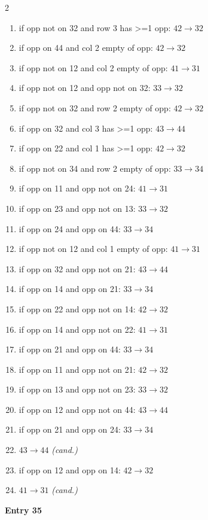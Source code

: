 \begin{multicols}{2}
\begin{tikzpicture}[scale=0.24]
\end{tikzpicture}
\nopagebreak\begin{enumerate}[topsep=1pt,itemsep=0pt,parsep=0pt,leftmargin=2.2em,label=\arabic*.]
\item if opp not on 32 and row 3 has >=1 opp: $42\!\to\!32$
\item if opp on 44 and col 2 empty of opp: $42\!\to\!32$
\item if opp not on 12 and col 2 empty of opp: $41\!\to\!31$
\item if opp not on 12 and opp not on 32: $33\!\to\!32$
\item if opp not on 32 and row 2 empty of opp: $42\!\to\!32$
\item if opp on 32 and col 3 has >=1 opp: $43\!\to\!44$
\item if opp on 22 and col 1 has >=1 opp: $42\!\to\!32$
\item if opp not on 34 and row 2 empty of opp: $33\!\to\!34$
\item if opp on 11 and opp not on 24: $41\!\to\!31$
\item if opp on 23 and opp not on 13: $33\!\to\!32$
\item if opp on 24 and opp on 44: $33\!\to\!34$
\item if opp not on 12 and col 1 empty of opp: $41\!\to\!31$
\item if opp on 32 and opp not on 21: $43\!\to\!44$
\item if opp on 14 and opp on 21: $33\!\to\!34$
\item if opp on 22 and opp not on 14: $42\!\to\!32$
\item if opp on 14 and opp not on 22: $41\!\to\!31$
\item if opp on 21 and opp on 44: $33\!\to\!34$
\item if opp on 11 and opp not on 21: $42\!\to\!32$
\item if opp on 13 and opp not on 23: $33\!\to\!32$
\item if opp on 12 and opp not on 44: $43\!\to\!44$
\item if opp on 21 and opp on 24: $33\!\to\!34$
\item $43\!\to\!44$ \hfill\textit{(cand.)}
\item if opp on 12 and opp on 14: $42\!\to\!32$
\item $41\!\to\!31$ \hfill\textit{(cand.)}
\end{enumerate}\smallskip
\noindent\textbf{Entry 35} \; 
\end{multicols}
